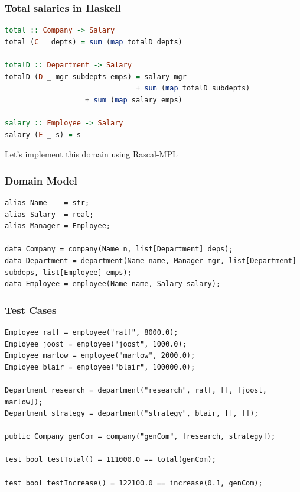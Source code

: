 \documentclass{beamer}
\begin{document}
\begin{frame}[fragile]
  \frametitle{Total salaries in Haskell}

  \begin{lstlisting}[language=Haskell]
total :: Company -> Salary
total (C _ depts) = sum (map totalD depts)

totalD :: Department -> Salary
totalD (D _ mgr subdepts emps) = salary mgr
                               + sum (map totalD subdepts)
			       + sum (map salary emps)

salary :: Employee -> Salary
salary (E _ s) = s

  \end{lstlisting} 
\end{frame}

\begin{frame}
 \huge{Let's implement this domain using Rascal-MPL}
\end{frame}


\begin{frame}[fragile]
  \frametitle{Domain Model}

  \begin{lstlisting}[language=Rascal]
alias Name    = str;
alias Salary  = real; 
alias Manager = Employee; 

data Company = company(Name n, list[Department] deps); 
data Department = department(Name name, Manager mgr, list[Department] subdeps, list[Employee] emps); 
data Employee = employee(Name name, Salary salary); 
  \end{lstlisting}  
\end{frame}

\begin{frame}[fragile]
  \frametitle{Test Cases}

  \begin{lstlisting}
Employee ralf = employee("ralf", 8000.0); 
Employee joost = employee("joost", 1000.0);
Employee marlow = employee("marlow", 2000.0);
Employee blair = employee("blair", 100000.0);

Department research = department("research", ralf, [], [joost, marlow]); 
Department strategy = department("strategy", blair, [], []); 

public Company genCom = company("genCom", [research, strategy]);

test bool testTotal() = 111000.0 == total(genCom);

test bool testIncrease() = 122100.0 == increase(0.1, genCom);
  \end{lstlisting}
\end{frame}
\end{document}
